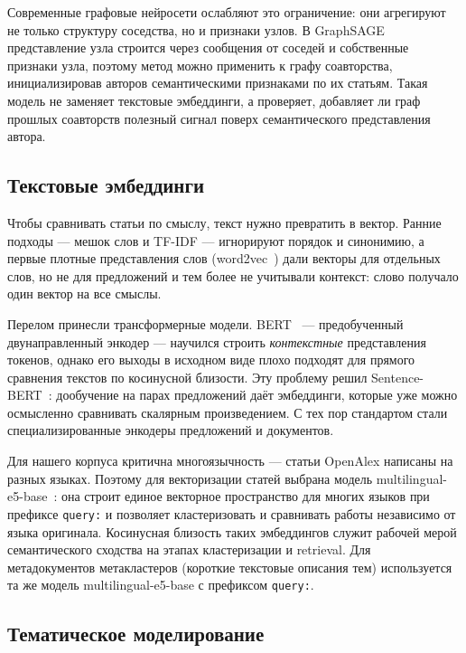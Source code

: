Современные графовые нейросети ослабляют это ограничение: они агрегируют не только структуру
соседства, но и признаки узлов. В GraphSAGE~\cite{hamilton2017graphsage} представление узла
строится через сообщения от соседей и собственные признаки узла, поэтому метод можно применить к
графу соавторства, инициализировав авторов семантическими признаками по их статьям. Такая модель
не заменяет текстовые эмбеддинги, а проверяет, добавляет ли граф прошлых соавторств полезный сигнал
поверх семантического представления автора.

\subsection{Текстовые эмбеддинги}

Чтобы сравнивать статьи по смыслу, текст нужно превратить в вектор. Ранние подходы — мешок слов и
TF-IDF — игнорируют порядок и синонимию, а первые плотные представления слов
(word2vec~\cite{mikolov2013word2vec}) дали векторы для отдельных слов, но не для предложений и тем
более не учитывали контекст: слово получало один вектор на все смыслы.

Перелом принесли трансформерные модели. BERT~\cite{devlin2019bert} — предобученный двунаправленный
энкодер — научился строить \emph{контекстные} представления токенов, однако его выходы в исходном
виде плохо подходят для прямого сравнения текстов по косинусной близости. Эту проблему решил
Sentence-BERT~\cite{reimers2019sbert}: дообучение на парах предложений даёт эмбеддинги, которые уже
можно осмысленно сравнивать скалярным произведением. С тех пор стандартом стали специализированные
энкодеры предложений и документов.

Для нашего корпуса критична многоязычность — статьи OpenAlex написаны на разных языках. Поэтому
для векторизации статей выбрана модель multilingual-e5-base~\cite{wang2024multilinguale5}: она
строит единое векторное пространство для многих языков при префиксе \texttt{query:} и позволяет
кластеризовать и сравнивать работы независимо от языка оригинала. Косинусная близость таких
эмбеддингов служит рабочей мерой семантического сходства на этапах кластеризации и retrieval.
Для метадокументов метакластеров (короткие текстовые описания тем) используется та же
модель multilingual-e5-base с префиксом \texttt{query:}.

\subsection{Тематическое моделирование}

